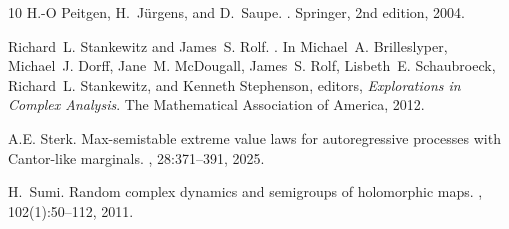 \documentclass[a4paper,12pt]{article}
\begin{document}
\begin{thebibliography}{10}
H.-O Peitgen, H.~J\"{u}rgens, and D.~Saupe.
.
\newblock Springer, 2nd edition, 2004.

Richard~L. Stankewitz and James~S. Rolf.
.
\newblock In Michael~A. Brilleslyper, Michael~J. Dorff, Jane~M. McDougall,
  James~S. Rolf, Lisbeth~E. Schaubroeck, Richard~L. Stankewitz, and Kenneth
  Stephenson, editors, {\em Explorations in Complex Analysis}. The Mathematical
  Association of America, 2012.

A.E. Sterk.
\newblock Max-semistable extreme value laws for autoregressive processes with
  {Cantor-like} marginals.
, 28:371--391, 2025.

H.~Sumi.
\newblock Random complex dynamics and semigroups of holomorphic maps.
, 102(1):50--112,
  2011.

\end{thebibliography}
\end{document}
